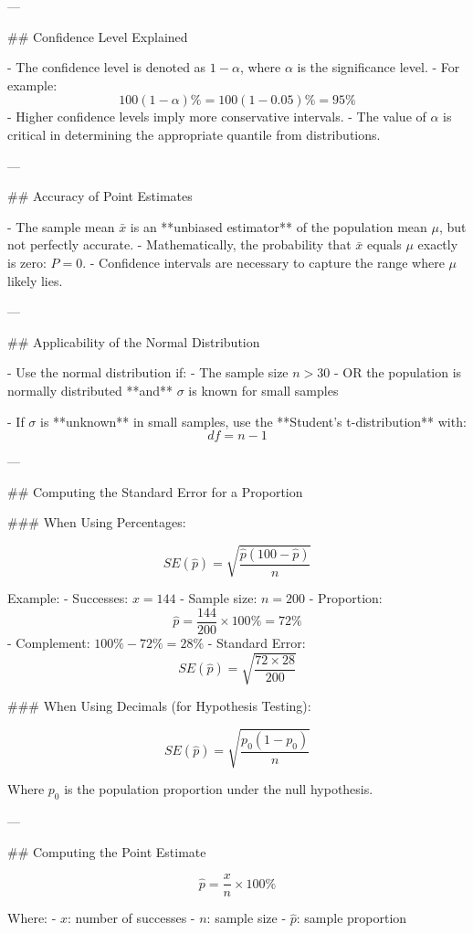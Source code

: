 ---

## Confidence Level Explained

- The confidence level is denoted as \( 1 - \alpha \), where \( \alpha \) is the significance level.
- For example:
  \[
  100(1 - \alpha)\% = 100(1 - 0.05)\% = 95\%
  \]
- Higher confidence levels imply more conservative intervals.
- The value of \( \alpha \) is critical in determining the appropriate quantile from distributions.

---

## Accuracy of Point Estimates

- The sample mean \( \bar{x} \) is an **unbiased estimator** of the population mean \( \mu \), but not perfectly accurate.
- Mathematically, the probability that \( \bar{x} \) equals \( \mu \) exactly is zero: \( P = 0 \).
- Confidence intervals are necessary to capture the range where \( \mu \) likely lies.

---

## Applicability of the Normal Distribution

- Use the normal distribution if:
  - The sample size \( n > 30 \)
  - OR the population is normally distributed **and** \( \sigma \) is known for small samples

- If \( \sigma \) is **unknown** in small samples, use the **Student's t-distribution** with:
  \[
  df = n - 1
  \]

---

## Computing the Standard Error for a Proportion

### When Using Percentages:

\[
SE(\hat{p}) = \sqrt{ \frac{ \hat{p}(100 - \hat{p}) }{n} }
\]

Example:
- Successes: \( x = 144 \)
- Sample size: \( n = 200 \)
- Proportion:  
  \[
  \hat{p} = \frac{144}{200} \times 100\% = 72\%
  \]
- Complement: \( 100\% - 72\% = 28\% \)
- Standard Error:
  \[
  SE(\hat{p}) = \sqrt{ \frac{72 \times 28}{200} }
  \]

### When Using Decimals (for Hypothesis Testing):

\[
SE(\hat{p}) = \sqrt{ \frac{p_0(1 - p_0)}{n} }
\]

Where \( p_0 \) is the population proportion under the null hypothesis.

---

## Computing the Point Estimate

\[
\hat{p} = \frac{x}{n} \times 100\%
\]

Where:
- \( x \): number of successes  
- \( n \): sample size  
- \( \hat{p} \): sample proportion

